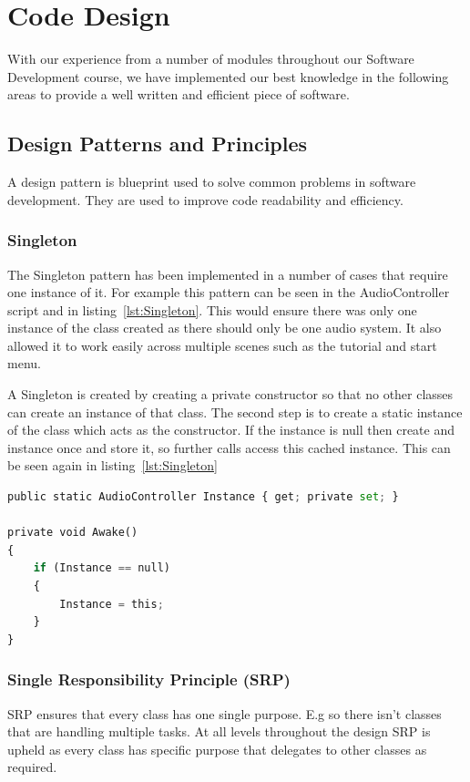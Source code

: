 \section{Code Design}
With our experience from a number of modules throughout our Software Development course, we have implemented our best knowledge in the following areas to provide a well written and efficient piece of software.

\subsection{Design Patterns and Principles}
A design pattern is blueprint used to solve common problems in software development. They are used to improve code readability and efficiency. 

\subsubsection{Singleton}
The Singleton pattern has been implemented in a number of cases that require one instance of it. For example this pattern can be seen in the AudioController script and in listing~\ref{lst:Singleton}. This would ensure there was only one instance of the class created as there should only be one audio system. It also allowed it to work easily across multiple scenes such as the tutorial and start menu.

A Singleton is created by creating a private constructor so that no other classes can create an instance of that class. The second step is to create a static instance of the class which acts as the constructor. If the instance is null then create and instance once and store it, so further calls access this cached instance. This can be seen again in listing~\ref{lst:Singleton}

\begin{lstlisting}[caption={Singleton - implemented in the AudioController script.},label={lst:Singleton},language=python]
public static AudioController Instance { get; private set; }

private void Awake()
{
    if (Instance == null)
    {
        Instance = this;
    }
}
\end{lstlisting}

\subsubsection{Single Responsibility Principle (SRP)}
SRP ensures that every class has one single purpose. E.g so there isn't classes that are handling multiple tasks. At all levels throughout the design SRP is upheld as every class has specific purpose that delegates to other classes as required.


